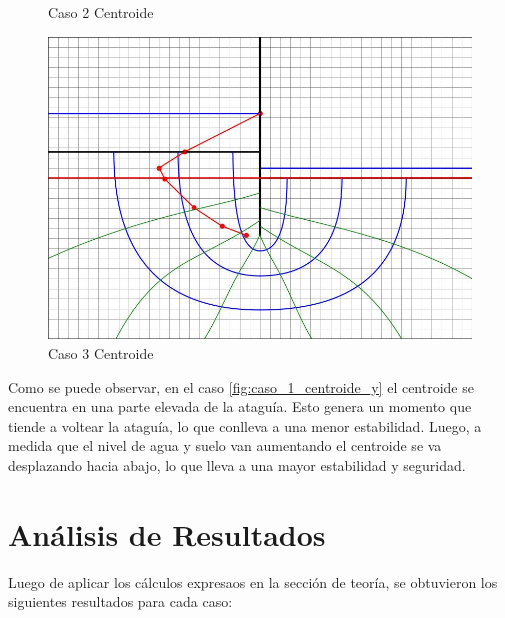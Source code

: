 \begin{figure}[H]
\begin{minipage}{0.32\textwidth}
        \caption{Caso 2 Centroide}
        \label{fig:caso_2_centroide_y}
    \end{minipage}
    \begin{minipage}{0.32\textwidth}
        \centering
        \includegraphics[width=\textwidth]{GRAFICOS/caso_3_centroide_y.jpg}
        \caption{Caso 3 Centroide}
        \label{fig:caso_3_centroide_y}
    \end{minipage}
\end{figure}

Como se puede observar, en el caso \ref{fig:caso_1_centroide_y} el centroide se encuentra en una parte elevada de la ataguía. Esto genera un momento que tiende a voltear la ataguía, lo que conlleva a una menor estabilidad. Luego, a medida que el nivel de agua y suelo van aumentando el centroide se va desplazando hacia abajo, lo que lleva a una mayor estabilidad y seguridad. 

\section{Análisis de Resultados}

Luego de aplicar los cálculos expresaos en la sección de teoría, se obtuvieron los siguientes resultados para cada caso:

